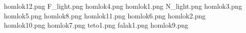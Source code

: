 homlok12.png
F_light.png
homlok4.png
homlok1.png
N_light.png
homlok3.png
homlok5.png
homlok8.png
homlok11.png
homlok6.png
homlok2.png
homlok10.png
homlok7.png
teto1.png
falak1.png
homlok9.png
